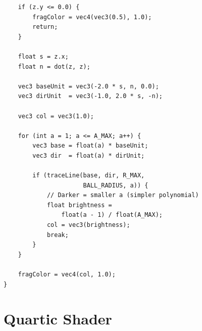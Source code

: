 \documentclass[11pt]{article}
\begin{document}
\begin{lstlisting}
    if (z.y <= 0.0) {
        fragColor = vec4(vec3(0.5), 1.0);
        return;
    }

    float s = z.x;
    float n = dot(z, z);

    vec3 baseUnit = vec3(-2.0 * s, n, 0.0);
    vec3 dirUnit  = vec3(-1.0, 2.0 * s, -n);

    vec3 col = vec3(1.0);

    for (int a = 1; a <= A_MAX; a++) {
        vec3 base = float(a) * baseUnit;
        vec3 dir  = float(a) * dirUnit;

        if (traceLine(base, dir, R_MAX,
                      BALL_RADIUS, a)) {
            // Darker = smaller a (simpler polynomial)
            float brightness =
                float(a - 1) / float(A_MAX);
            col = vec3(brightness);
            break;
        }
    }

    fragColor = vec4(col, 1.0);
}
\end{lstlisting}


\section{Quartic Shader}
\label{app:quartic}
\end{document}
